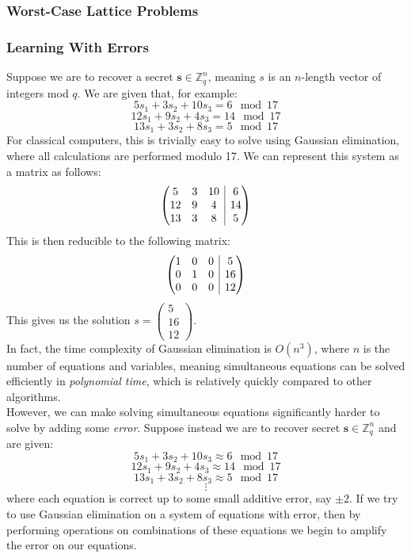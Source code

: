 \documentclass{article}
\begin{document}
\subsubsection{Worst-Case Lattice Problems}
\subsubsection{Learning With Errors}
Suppose we are to recover a secret $\bm{s} \in \mathbb{Z}^{n}_{q}$, meaning $s$ is an $n$-length vector of integers mod $q$.
We are given that, for example:
\[ 5s_{1} + 3s_{2} + 10s_{3} = 6 \mod{17} \] 
\[ 12s_{1} + 9s_{2} + 4s_{3} = 14 \mod{17} \] 
\[ 13s_{1} + 3s_{2} + 8s_{3} = 5 \mod{17} \] 
For classical computers, this is trivially easy to solve using Gaussian
elimination, where all calculations are performed modulo 17. We can represent
this system as a matrix as follows:
\[
\left(\begin{array}{@{}ccc|c@{}}
   5 & 3 & 10 & 6 \\
   12 & 9 & 4 & 14 \\
   13 & 3 & 8 & 5
\end{array}\right)
\]
This is then reducible to the following matrix:
\[
\left(\begin{array}{@{}ccc|c@{}}
   1 & 0 & 0 & 5 \\
   0 & 1 & 0 & 16 \\
   0 & 0 & 0 & 12
\end{array}\right)
\]
This gives us the solution $s = \begin{pmatrix} 5 \\ 16 \\ 12 \end{pmatrix}$. \\
In fact, the time complexity of Gaussian elimination is $O(n^{3})$, where $n$
is the number of equations and variables, meaning simultaneous equations can be
solved efficiently in \textit{polynomial time}, which is relatively quickly
compared to other algorithms.
\\

However, we can make solving simultaneous equations significantly harder to solve by adding some \textit{error}.
Suppose instead we are to recover secret $\bm{s} \in \mathbb{Z}^{n}_{q}$ and are given:
\[ 5s_{1} + 3s_{2} + 10s_{3} \approx 6 \mod{17} \] 
\[ 12s_{1} + 9s_{2} + 4s_{3} \approx 14 \mod{17} \] 
\[ 13s_{1} + 3s_{2} + 8s_{3} \approx 5 \mod{17} \] 
\[\vdots\]
where each equation is correct up to some small additive error, say $\pm 2$. If
we try to use Gaussian elimination on a system of equations with error, then by
performing operations on combinations of these equations we begin to amplify
the error on our equations.
\medskip
\end{document}
